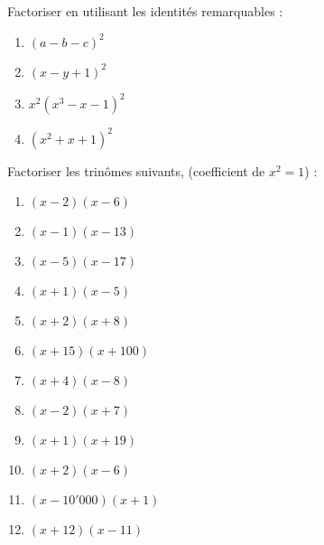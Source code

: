 \begin{solution}
Factoriser en utilisant les identités remarquables : 
\begin{multicols}{2}
\begin{enumerate}
\item ${{(a-b-c)}^{2}}$
\item ${{(x-y+1)}^{2}}$
\item ${{x}^{2}}{{({{x}^{3}}-x-1)}^{2}}$
\item ${{\left( {{x}^{2}}+x+1 \right)}^{2}}$ 
\end{enumerate}
\end{multicols}
\end{solution}

\begin{solution}
Factoriser les trinômes suivants, (coefficient de $x^2 = 1$) : 
\begin{multicols}{2}
\begin{enumerate}
\item  $(x-2)(x-6)$
\item $(x-1)(x-13)$
\item $(x-5)(x-17)$
\item $(x+1)(x-5)$
\item $(x+2)(x+8)$
\item $(x+15)(x+100)$
\item $(x+4)(x-8)$
\item $(x-2)(x+7)$
\item $(x+1)(x+19)$
\item $(x+2)(x-6)$
\item $(x-10'000)(x+1)$
\item $(x+12)(x-11)$ 
\end{enumerate}
\end{multicols}
\end{solution}

